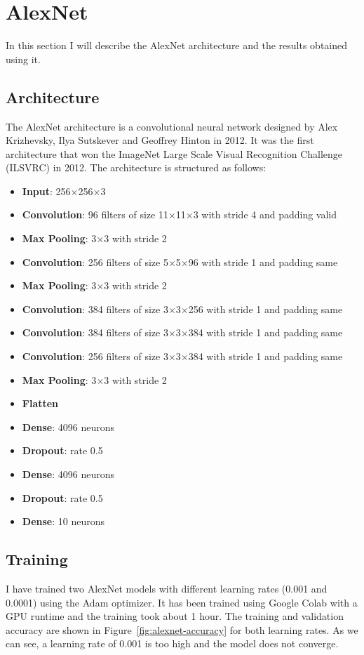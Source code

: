 \section{AlexNet}\label{sec:alexnet}
In this section I will describe the AlexNet architecture and the results obtained using it.

\subsection{Architecture}\label{sec:alexnet-architecture}
The AlexNet architecture is a convolutional neural network designed by Alex Krizhevsky, Ilya Sutskever and Geoffrey Hinton in 2012.
It was the first architecture that won the ImageNet Large Scale Visual Recognition Challenge (ILSVRC) in 2012.
The architecture is structured as follows:
\begin{itemize}
    \item \textbf{Input}: 256$\times$256$\times$3
    \item \textbf{Convolution}: 96 filters of size 11$\times$11$\times$3 with stride 4 and padding valid
    \item \textbf{Max Pooling}: 3$\times$3 with stride 2
    \item \textbf{Convolution}: 256 filters of size 5$\times$5$\times$96 with stride 1 and padding same
    \item \textbf{Max Pooling}: 3$\times$3 with stride 2
    \item \textbf{Convolution}: 384 filters of size 3$\times$3$\times$256 with stride 1 and padding same
    \item \textbf{Convolution}: 384 filters of size 3$\times$3$\times$384 with stride 1 and padding same
    \item \textbf{Convolution}: 256 filters of size 3$\times$3$\times$384 with stride 1 and padding same
    \item \textbf{Max Pooling}: 3$\times$3 with stride 2
    \item \textbf{Flatten}
    \item \textbf{Dense}: 4096 neurons
    \item \textbf{Dropout}: rate 0.5
    \item \textbf{Dense}: 4096 neurons
    \item \textbf{Dropout}: rate 0.5
    \item \textbf{Dense}: 10 neurons
\end{itemize}
\newpage
\subsection{Training}\label{sec:alexnet-training}
I have trained two AlexNet models with different learning rates (0.001 and 0.0001) using the Adam optimizer.
It has been trained using Google Colab with a GPU runtime and the training took about 1 hour.
The training and validation accuracy are shown in Figure~\ref{fig:alexnet-accuracy} for both learning rates.
As we can see, a learning rate of 0.001 is too high and the model does not converge.

